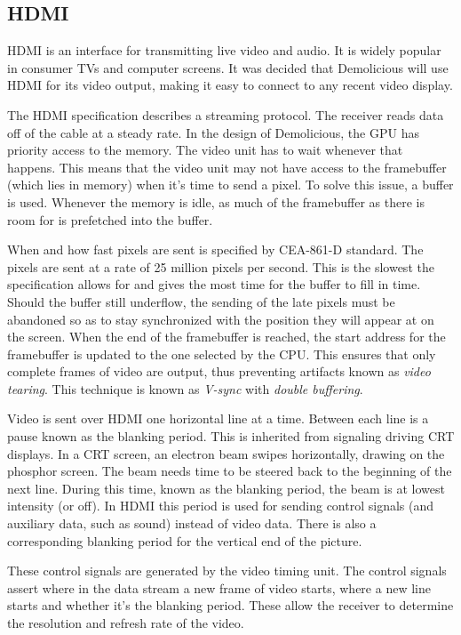 \documentclass[../main/report.tex]{subfiles}
\begin{document}
\subsection{HDMI}

HDMI is an interface for transmitting live video and audio.
It is widely popular in consumer TVs and computer screens.
It was decided that Demolicious will use HDMI for its video output, making it easy to connect to any recent video display.

The HDMI specification\cite{hdmi-spec} describes a streaming protocol.
The receiver reads data off of the cable at a steady rate.
In the design of Demolicious, the GPU has priority access to the memory.
The video unit has to wait whenever that happens.
This means that the video unit may not have access to the framebuffer (which lies in memory) when it's time to send a pixel.
To solve this issue, a buffer is used.
Whenever the memory is idle, as much of the framebuffer as there is room for is prefetched into the buffer.

When and how fast pixels are sent is specified by CEA-861-D\cite{timings-spec} standard.
The pixels are sent at a rate of 25 million pixels per second.
This is the slowest the specification allows for and gives the most time for the buffer to fill in time.
Should the buffer still underflow, the sending of the late pixels must be abandoned so as to stay synchronized with the position they will appear at on the screen.
When the end of the framebuffer is reached, the start address for the framebuffer is updated to the one selected by the CPU.
This ensures that only complete frames of video are output, thus preventing artifacts known as \emph{video tearing}.
This technique is known as \emph{V-sync} with \emph{double buffering}.

Video is sent over HDMI one horizontal line at a time.
Between each line is a pause known as the blanking period.
This is inherited from signaling driving CRT displays.
In a CRT screen, an electron beam swipes horizontally, drawing on the phosphor screen.
The beam needs time to be steered back to the beginning of the next line.
During this time, known as the blanking period, the beam is at lowest intensity (or off).
In HDMI this period is used for sending control signals (and auxiliary data, such as sound) instead of video data.
There is also a corresponding blanking period for the vertical end of the picture.

These control signals are generated by the video timing unit.
The control signals assert where in the data stream a new frame of video starts, where a new line starts and whether it's the blanking period.
These allow the receiver to determine the resolution and refresh rate of the video.
\end{document}
